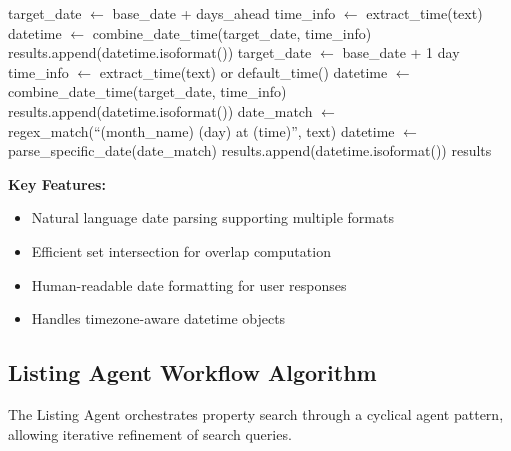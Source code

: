 \begin{algorithm}[H]
\begin{algorithmic}[1]
            \STATE target\_date $\leftarrow$ base\_date + days\_ahead
            \STATE
            \STATE {}
            \STATE time\_info $\leftarrow$ extract\_time(text)
                \STATE datetime $\leftarrow$ combine\_date\_time(target\_date, time\_info)
                \STATE results.append(datetime.isoformat())
            \ENDIF
        \ENDIF
    \ENDFOR
    \STATE
    \STATE {}
        \STATE target\_date $\leftarrow$ base\_date + 1 day
        \STATE time\_info $\leftarrow$ extract\_time(text) or default\_time()
        \STATE datetime $\leftarrow$ combine\_date\_time(target\_date, time\_info)
        \STATE results.append(datetime.isoformat())
    \ENDIF
    \STATE
    \STATE {}
    \STATE date\_match $\leftarrow$ regex\_match(``(month\_name) (day) at (time)'', text)
        \STATE datetime $\leftarrow$ parse\_specific\_date(date\_match)
        \STATE results.append(datetime.isoformat())
    \ENDIF
    \RETURN results
\ENDFUNCTION
\end{algorithmic}
\end{algorithm}

\textbf{Key Features:}
\begin{itemize}
    \item Natural language date parsing supporting multiple formats
    \item Efficient set intersection for overlap computation
    \item Human-readable date formatting for user responses
    \item Handles timezone-aware datetime objects
\end{itemize}

\subsection{Listing Agent Workflow Algorithm}

The Listing Agent orchestrates property search through a cyclical agent pattern, allowing iterative refinement of search queries.

